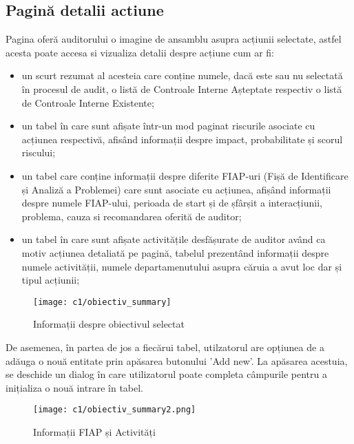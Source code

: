 \subsection{Pagină detalii actiune}
Pagina oferă auditorului o imagine de ansamblu asupra acțiunii selectate, astfel acesta poate accesa si vizualiza detalii despre acțiune cum ar fi:\\
\begin{itemize}
	\item un scurt rezumat al acesteia care conține numele, dacă este sau nu selectată în procesul de audit, o listă de Controale Interne Așteptate respectiv o listă de Controale Interne Existente;
	
	\item  un tabel în care sunt afișate într-un mod paginat riscurile asociate cu acțiunea respectivă, afisând informații despre impact, probabilitate și scorul riscului;
	
	\item  un tabel care conține informații despre diferite FIAP-uri (Fișă de Identificare și Analiză a Problemei) care sunt asociate cu acțiunea, afișând informații despre numele FIAP-ului, perioada de start și de șfârșit a interacțiunii, problema, cauza si recomandarea oferită de auditor;
	
	\item  un tabel  în care sunt afișate activitățile desfășurate de auditor având ca motiv acțiunea detaliată pe pagină, tabelul prezentând informații despre numele activității, numele departamenutului asupra căruia a avut loc dar și tipul acțiunii;
	
\end{itemize}


\vspace{1cm}
\begin{figure}[h]
	\centering
	
	\texttt{[image: c1/obiectiv\_summary]}
	\caption{Informații despre obiectivul selectat}
\end{figure}


De asemenea, în partea de jos a fiecărui tabel, utilzatorul are opțiunea de a adăuga o nouă entitate prin apăsarea butonului 'Add new'. La apăsarea acestuia, se deschide un dialog în care utilizatorul poate completa câmpurile pentru a inițializa o nouă intrare în tabel.

\vspace{1cm}
\begin{figure}[h]
	\centering
	
	\texttt{[image: c1/obiectiv\_summary2.png]}
	\caption{Informații FIAP și Activități}
\end{figure}


